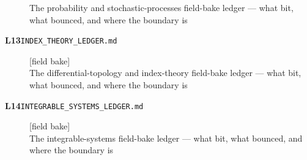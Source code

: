 \begin{description}
The probability and stochastic-processes field-bake ledger --- what bit, what bounced, and where the boundary is
\item[\ldglabel{index_theory}{L13}\textbf{L13}\quad\texttt{INDEX\_THEORY\_LEDGER.md}]\hfill\textsf{[field bake]}\\
The differential-topology and index-theory field-bake ledger --- what bit, what bounced, and where the boundary is
\item[\ldglabel{integrable_systems}{L14}\textbf{L14}\quad\texttt{INTEGRABLE\_SYSTEMS\_LEDGER.md}]\hfill\textsf{[field bake]}\\
The integrable-systems field-bake ledger --- what bit, what bounced, and where the boundary is
\end{description}
\endgroup
